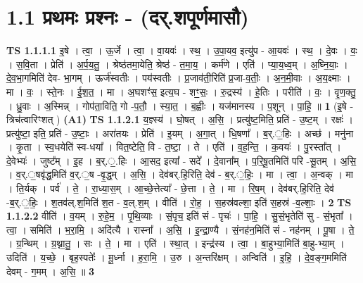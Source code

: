 \documentclass[17pt]{extarticle}
\begin{document}
\section*{ 1.1     प्रथमः प्रश्नः - (दर्.शपूर्णमासौ) }
                                \textbf{ TS 1.1.1.1} \newline
                  इ॒षे । त्वा॒ । ऊ॒र्जे । त्वा॒ । वा॒यवः॑ । स्थ॒ । उ॒पा॒यव॒ इत्यु॑प - आ॒यवः॑ । स्थ॒ । दे॒वः । वः॒ । स॒वि॒ता । प्रेति॑ । अ॒र्प॒य॒तु॒ । श्रेष्ठ॑तमा॒येति॒ श्रेष्ठ॑ - त॒मा॒य॒ । कर्म॑णे । एति॑ । प्या॒य॒ध्व॒म् । अ॒घ्नि॒याः॒ । दे॒व॒भा॒गमिति॑ देव- भा॒गम् । ऊर्ज॑स्वतीः । पय॑स्वतीः । प्र॒जाव॑ती॒रिति॑ प्र॒जा-व॒तीः॒ । अ॒न॒मी॒वाः । अ॒य॒क्ष्माः । मा । वः॒ । स्ते॒नः । ई॒श॒त॒ । मा । अ॒घशꣳ॑स॒ इत्य॒घ - शꣳ॒॒सः॒ । रु॒द्रस्य॑ । हे॒तिः । परीति॑ । वः॒ । वृ॒ण॒क्तु॒ । ध्रु॒वाः । अ॒स्मिन्न् । गोप॑ता॒विति॒ गो -प॒तौ॒ । स्या॒त॒ । ब॒ह्वीः । यज॑मानस्य । प॒शून् । पा॒हि॒ ॥ \textbf{  1 } \newline
                  \newline
                      (इ॒षे - त्रिच॑त्वारिꣳशत् )  \textbf{(A1)} \newline \newline
                                \textbf{ TS 1.1.2.1} \newline
                  य॒ज्ञ्स्य॑ । घो॒षत् । अ॒सि॒ । प्रत्यु॑ष्ट॒मिति॒ प्रति॑ - उ॒ष्ट॒म् । रक्षः॑ । प्रत्यु॑ष्टा॒ इति॒ प्रति॑ - उ॒ष्टाः॒ । अरा॑तयः । प्रेति॑ । इ॒यम् । अ॒गा॒त् । धि॒षणा᳚ । ब॒र्.॒हिः । अच्छ॑ । मनु॑ना । कृ॒ता । स्व॒धयेति॑ स्व-धया᳚ । वित॒ष्टेति॒ वि - त॒ष्टा॒ । ते । एति॑ । व॒ह॒न्ति॒ । क॒वयः॑ । पु॒रस्ता᳚त् । दे॒वेभ्यः॑ । जुष्ट᳚म् । इ॒ह । ब॒र्.॒.हिः । आ॒सद॒ इत्या᳚ - सदे᳚ । दे॒वाना᳚म् । प॒रि॒षू॒तमिति॑ परि -सू॒तम् । अ॒सि॒ । व॒र्.॒षवृ॑द्ध॒मिति॑ व॒र्.॒ष -वृ॒द्ध॒म् । अ॒सि॒ । देव॑बर्.हि॒रिति॒ देव॑ - ब॒र्.॒हिः॒ । मा । त्वा॒ । अ॒न्वक् । मा । ति॒र्यक् । पर्व॑ । ते॒ । रा॒ध्या॒स॒म् । आ॒च्छे॒त्तेत्या᳚ - छे॒त्ता । ते॒ । मा । रि॒ष॒म् । देव॑बर्.हि॒रिति॒ देव॑ -ब॒र्.॒हिः॒ । श॒तव॑ल्.श॒मिति॑ श॒त - व॒ल्.श॒म् । वीति॑ । रो॒ह॒ । स॒हस्र॑वल्शा॒ इति॑ स॒हस्र॑ -व॒ल्शाः॒ । \textbf{  2 } \newline
                  \newline
                                \textbf{ TS 1.1.2.2} \newline
                  वीति॑ । व॒यम् । रु॒हे॒म॒ । पृ॒थि॒व्याः । सं॒पृच॒ इति॑ सं - पृचः॑ । पा॒हि॒ । सु॒सं॒भृतेति॑ सु - सं॒भृता᳚ । त्वा॒ । समिति॑ । भ॒रा॒मि॒ । अदि॑त्यै । रास्ना᳚ । अ॒सि॒ । इ॒न्द्रा॒ण्यै । सं॒नह॑न॒मिति॑ सं - नह॑नम् । पू॒षा । ते॒ । ग्र॒न्थिम् । ग्र॒थ्ना॒तु॒ । सः । ते॒ । मा । एति॑ । स्था॒त् । इन्द्र॑स्य । त्वा॒ । बा॒हुभ्या॒मिति॑ बा॒हु-भ्या॒म् । उदिति॑ । य॒च्छे॒ । बृह॒स्पतेः᳚ । मू॒र्ध्ना । ह॒रा॒मि॒ । उ॒रु । अ॒न्तरि॑क्षम् । अन्विति॑ । इ॒हि॒ । दे॒व॒ङ्ग॒ममिति॑ देवम् - ग॒मम् । अ॒सि॒ ॥ \textbf{  3 } \newline
\end{document}
